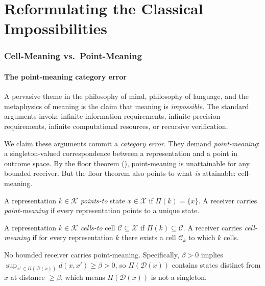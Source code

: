 \documentclass[11pt,a4paper]{article}
\newcommand{\K}{\mathcal{K}}
\newcommand{\D}{\mathcal{D}}
\newcommand{\X}{\mathcal{X}}
\newcommand{\Cell}{\mathcal{C}}
\begin{document}
\part{Reformulating the Classical Impossibilities}

\section{Cell-Meaning vs.\ Point-Meaning}
\label{sec:cell-meaning}

\subsection{The point-meaning category error}

A pervasive theme in the philosophy of mind, philosophy of language,
and the metaphysics of meaning is the claim that meaning is
\emph{impossible}. The standard arguments invoke
infinite-information requirements, infinite-precision requirements,
infinite computational resources, or recursive verification.

We claim these arguments commit a \emph{category error}. They demand
\emph{point-meaning}: a singleton-valued correspondence between a
representation and a point in outcome space. By the floor theorem
(), point-meaning is unattainable for any bounded
receiver. But the floor theorem also points to what \emph{is}
attainable: cell-meaning.

\begin{definition}\label{def:point-meaning}
A representation $k\in\K$ \emph{points-to} state $x\in\X$ if
$\Pi(k)=\{x\}$. A receiver carries \emph{point-meaning} if every
representation points to a unique state.
\end{definition}

\begin{definition}\label{def:cell-meaning}
A representation $k\in\K$ \emph{cells-to} cell $\Cell\subseteq\X$ if
$\Pi(k)\subseteq\Cell$. A receiver carries \emph{cell-meaning} if for
every representation $k$ there exists a cell $\Cell_k$ to which $k$
cells.
\end{definition}

\begin{theorem}\label{thm:no-point}
No bounded receiver carries point-meaning. Specifically, $\beta>0$
implies $\sup_{x'\in\Pi(\D(x))}d(x,x')\ge\beta>0$, so $\Pi(\D(x))$
contains states distinct from $x$ at distance $\ge\beta$, which means
$\Pi(\D(x))$ is not a singleton.
\end{theorem}
\end{document}
